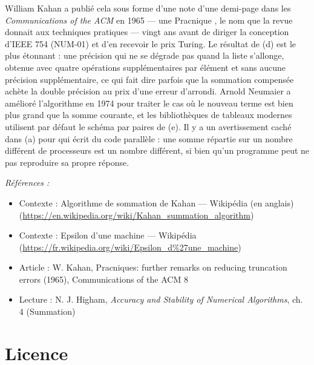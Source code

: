 \documentclass[11pt]{article}
\newenvironment{refs}{\par\small\noindent\emph{Références :}\begin{itemize}\setlength\itemsep{0pt}}{\end{itemize}\normalsize}
\begin{document}
\noindent William Kahan a publié cela sous forme d'une note d'une demi-page dans les \textit{Communications of the ACM} en 1965 --- une \og{} Pracnique \fg{}, le nom que la revue donnait aux techniques pratiques --- vingt ans avant de diriger la conception d'IEEE 754 (NUM-01) et d'en recevoir le prix Turing. Le résultat de (d) est le plus étonnant : une précision qui ne se dégrade pas quand la liste s'allonge, obtenue avec quatre opérations supplémentaires par élément et sans aucune précision supplémentaire, ce qui fait dire parfois que la sommation compensée achète la double précision au prix d'une erreur d'arrondi. Arnold Neumaier a amélioré l'algorithme en 1974 pour traiter le cas où le nouveau terme est bien plus grand que la somme courante, et les bibliothèques de tableaux modernes utilisent par défaut le schéma par paires de (e). Il y a un avertissement caché dans (a) pour qui écrit du code parallèle : une somme répartie sur un nombre différent de processeurs est un nombre différent, si bien qu'un programme peut ne pas reproduire sa propre réponse.

\begin{refs}
\item Contexte : Algorithme de sommation de Kahan --- Wikipédia (en anglais) (\url{https://en.wikipedia.org/wiki/Kahan_summation_algorithm})
\item Contexte : Epsilon d'une machine --- Wikipédia (\url{https://fr.wikipedia.org/wiki/Epsilon_d%27une_machine})
\item Article : W. Kahan, \og{} Pracniques: further remarks on reducing truncation errors \fg{} (1965), Communications of the ACM 8
\item Lecture : N. J. Higham, \textit{Accuracy and Stability of Numerical Algorithms}, ch. 4 (Summation)
\end{refs}

\bigskip


\section*{Licence}
\end{document}
